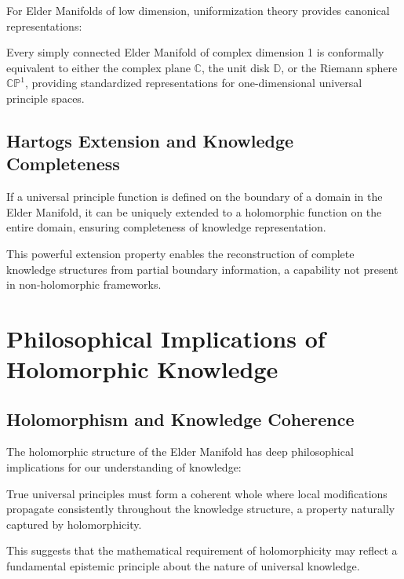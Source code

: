 For Elder Manifolds of low dimension, uniformization theory provides canonical representations:

\begin{theorem}
Every simply connected Elder Manifold of complex dimension 1 is conformally equivalent to either the complex plane $\mathbb{C}$, the unit disk $\mathbb{D}$, or the Riemann sphere $\mathbb{CP}^1$, providing standardized representations for one-dimensional universal principle spaces.
\end{theorem}

\subsection{Hartogs Extension and Knowledge Completeness}

\begin{theorem}
If a universal principle function is defined on the boundary of a domain in the Elder Manifold, it can be uniquely extended to a holomorphic function on the entire domain, ensuring completeness of knowledge representation.
\end{theorem}

This powerful extension property enables the reconstruction of complete knowledge structures from partial boundary information, a capability not present in non-holomorphic frameworks.

\section{Philosophical Implications of Holomorphic Knowledge}

\subsection{Holomorphism and Knowledge Coherence}

The holomorphic structure of the Elder Manifold has deep philosophical implications for our understanding of knowledge:

\begin{proposition}
True universal principles must form a coherent whole where local modifications propagate consistently throughout the knowledge structure, a property naturally captured by holomorphicity.
\end{proposition}

This suggests that the mathematical requirement of holomorphicity may reflect a fundamental epistemic principle about the nature of universal knowledge.

